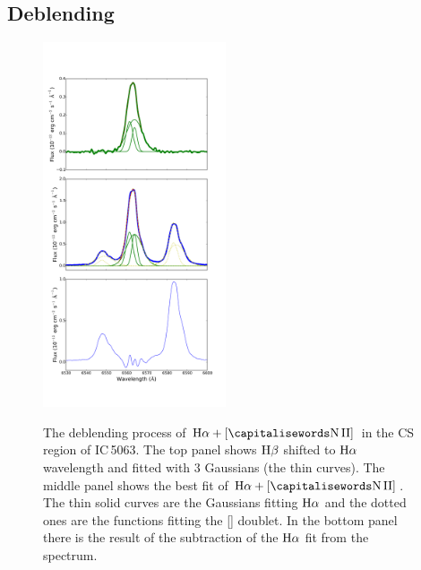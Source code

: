 \documentclass[../main.tex]{subfiles}
\begin{document}
\subsection{Deblending}
\label{sec:deblending}

\begin{figure}
\centering
\includegraphics[width=0.48\textwidth]{PhD_thesis/images/paper1/ha2.pdf} \\
\caption[]{The deblending process of $\Ha + [\ion{N}{II}]$ in the CS region of IC\,5063. The top panel shows $\rm H\beta$ shifted to $\rm H\alpha$ wavelength and fitted with $3$ Gaussians (the thin curves). The middle panel shows the best fit of $\Ha+[\ion{N}{II}]$. The thin solid curves are the Gaussians fitting $\rm H\alpha$ and the dotted ones are the functions fitting the [] doublet. In the bottom panel there is the result of the subtraction of the $\rm H\alpha$ fit from the spectrum. }
\label{fig:hadeb}
\end{figure}
\end{document}
